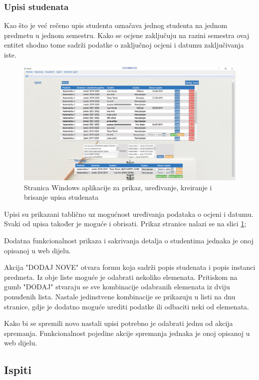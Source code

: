 \documentclass[times, utf8, diplomski]{fer}
\begin{document}
\subsubsection{Upisi studenata}
Kao što je već rečeno upis studenta označava jednog studenta na jednom predmetu u jednom semestru. Kako se ocjene zaključuju na razini semestra ovaj entitet shodno tome sadrži podatke o zaključnoj ocjeni i datumu zaključivanja iste.

\begin{figure}[htb]
\centering
\includegraphics[width=12cm]{enrolments.PNG}
\caption{Stranica Windows aplikacije za prikaz, uređivanje, kreiranje i brisanje upisa studenata}
\label{fig:enrolments}
\end{figure}

Upisi su prikazani tablično uz mogućnost uređivanja podataka o ocjeni i datumu. Svaki od upisa također je moguće i obrisati. Prikaz stranice nalazi se na slici \ref{fig:enrolments};

Dodatna funkcionalnost prikaza i sakrivanja detalja o studentima jednaka je onoj opisanoj u web dijelu.

Akcija "DODAJ NOVE" otvara formu koja sadrži popis studenata i popis instanci predmeta. Iz obje liste moguće je odabrati nekoliko elemenata. Pritiskom na gumb "DODAJ" stvaraju se sve kombinacije odabranih elemenata iz dviju ponuđenih lista. Nastale jedinstvene kombinacije se prikazuju u listi na dnu stranice, gdje je dodatno moguće urediti podatke ili odbaciti neki od elemenata. 

Kako bi se spremili novo nastali upisi potrebno je odabrati jednu od akcija spremanja. Funkcionalnost pojedine akcije spremanja jednaka je onoj opisanoj u web dijelu.

\subsection{Ispiti}
\end{document}
